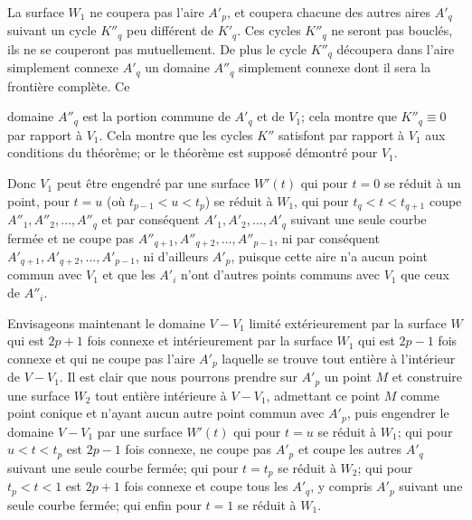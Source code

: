 \documentclass{article}
\begin{document}
La surface $W_{1}$ ne coupera pas l'aire $A'_{p}$, et coupera chacune des autres aires $A'_{q}$ suivant un cycle $K''_{q}$ peu différent de $K'_{q}$. Ces cycles $K''_{q}$ ne seront pas bouclés, ils ne se couperont pas mutuellement. De plus le cycle $K''_{q}$ découpera dans l'aire simplement connexe $A'_{q}$ un domaine $A''_{q}$ simplement connexe dont il sera la frontière complète. Ce

domaine $A''_{q}$ est la portion commune de $A'_{q}$ et de $V_{1}$; cela montre que $K''_{q} \equiv 0$ par rapport à $V_{1}$. Cela montre que les cycles $K''$ satisfont par rapport à $V_{1}$ aux conditions du théorème; or le théorème est supposé démontré pour $V_{1}$.

Donc $V_{1}$ peut être engendré par une surface $W'(t)$ qui pour $t = 0$ se réduit à un point, pour $t = u$ (où $t_{p-1} < u < t_{p}$) se réduit à $W_{1}$, qui pour $t_{q} < t < t_{q+1}$ coupe $A''_{1}, A''_{2}, \ldots, A''_{q}$ et par conséquent $A'_{1}, A'_{2}, \ldots, A'_{q}$ suivant une seule courbe fermée et ne coupe pas $A''_{q+1}, A''_{q+2}, \ldots, A''_{p-1}$, ni par conséquent $A'_{q+1}, A'_{q+2}, \ldots, A'_{p-1}$, ni d'ailleurs $A'_{p}$, puisque cette aire n'a aucun point commun avec $V_{1}$ et que les $A'_{i}$ n'ont d'autres points communs avec $V_{1}$ que ceux de $A''_{i}$.

Envisageons maintenant le domaine $V - V_{1}$ limité extérieurement par la surface $W$ qui est $2p + 1$ fois connexe et intérieurement par la surface $W_{1}$ qui est $2p - 1$ fois connexe et qui ne coupe pas l'aire $A'_{p}$ laquelle se trouve tout entière à l'intérieur de $V - V_{1}$. Il est clair que nous pourrons prendre sur $A'_{p}$ un point $M$ et construire une surface $W_{2}$ tout entière intérieure à $V - V_{1}$, admettant ce point $M$ comme point conique et n'ayant aucun autre point commun avec $A'_{p}$, puis engendrer le domaine $V - V_{1}$ par une surface $W'(t)$ qui pour $t = u$ se réduit à $W_{1}$; qui pour $u < t < t_{p}$ est $2p - 1$ fois connexe, ne coupe pas $A'_{p}$ et coupe les autres $A'_{q}$ suivant une seule courbe fermée; qui pour $t = t_{p}$ se réduit à $W_{2}$; qui pour $t_{p} < t < 1$ est $2p + 1$ fois connexe et coupe tous les $A'_{q}$, y compris $A'_{p}$ suivant une seule courbe fermée; qui enfin pour $t = 1$ se réduit à $W_{1}$.
\end{document}
